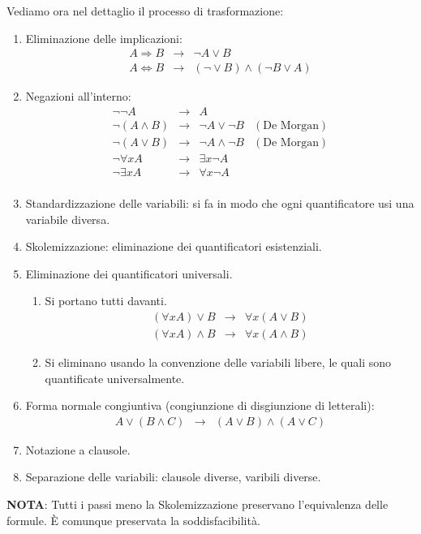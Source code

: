 Vediamo ora nel dettaglio il processo di trasformazione:
\begin{enumerate}
	\item Eliminazione delle implicazioni:
	      \[
		      \begin{array}{rcl}
			      A \Rightarrow B     & \rightarrow & \lnot A \vee B                         \\
			      A \Leftrightarrow B & \rightarrow & (\lnot \vee B) \wedge (\lnot B \vee A)
		      \end{array}
	      \]
	\item Negazioni all'interno:
	      \[
		      \begin{array}{rclr}
			      \lnot \lnot A      & \rightarrow & A                      &                    \\
			      \lnot (A \wedge B) & \rightarrow & \lnot A \vee \lnot B   & (\text{De Morgan}) \\
			      \lnot (A \vee B)   & \rightarrow & \lnot A \wedge \lnot B & (\text{De Morgan}) \\
			      \lnot \forall x A  & \rightarrow & \exists x \lnot A      &                    \\
			      \lnot \exists x A  & \rightarrow & \forall x \lnot A      &                    \\
		      \end{array}
	      \]
	\item Standardizzazione delle variabili: si fa in modo che ogni quantificatore usi una variabile diversa.
	\item Skolemizzazione: eliminazione dei quantificatori esistenziali.
	\item Eliminazione dei quantificatori universali.
	      \begin{enumerate}
		      \item Si portano tutti davanti.
		            \[
			            \begin{array}{rcl}
				            (\forall x A) \vee B   & \rightarrow & \forall x (A \vee B)   \\
				            (\forall x A) \wedge B & \rightarrow & \forall x (A \wedge B)
			            \end{array}
		            \]
		      \item Si eliminano usando la convenzione delle variabili libere, le quali sono quantificate
		            universalmente.
	      \end{enumerate}
	\item Forma normale congiuntiva (congiunzione di disgiunzione di letterali):
	      \[
		      \begin{array}{rcl}
			      A \vee (B \wedge C) & \rightarrow & (A \vee B) \wedge (A \vee C)
		      \end{array}
	      \]
	\item Notazione a clausole.
	\item Separazione delle variabili: clausole diverse, varibili diverse.
\end{enumerate}
\textbf{NOTA}: Tutti i passi meno la Skolemizzazione preservano l'equivalenza delle formule. \`E comunque
preservata la soddisfacibilit\`a.

